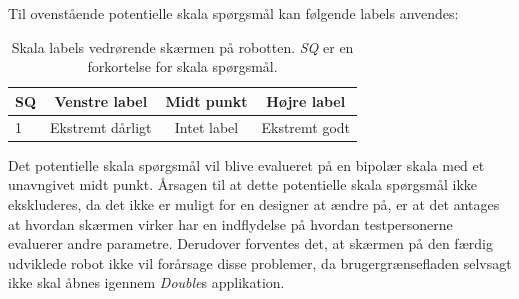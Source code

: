 %
Til ovenstående potentielle skala spørgsmål kan følgende labels anvendes:
%
\begin{table}[H]
	\centering 
	\begin{tabular}{l|c|c|c}
		SQ     & Venstre label & Midt punkt & Højre label \\\hline
		1   & Ekstremt dårligt & Intet label & Ekstremt godt                 
	\end{tabular}
\caption{Skala labels vedrørende skærmen på robotten. \textit{SQ} er en forkortelse for skala spørgsmål.}
	\label{tab:SkaermenR}
\end{table}
\noindent
%
Det potentielle skala spørgsmål vil blive evalueret på en bipolær skala med et unavngivet midt punkt. Årsagen til at dette potentielle skala spørgsmål ikke ekskluderes, da det ikke er muligt for en designer at ændre på, er at det antages at hvordan skærmen virker har en indflydelse på hvordan testpersonerne evaluerer andre parametre. Derudover forventes det, at skærmen på den færdig udviklede robot ikke vil forårsage disse problemer, da brugergrænsefladen selvsagt ikke skal åbnes igennem \textit{Double}s applikation. 
\newpage
%
